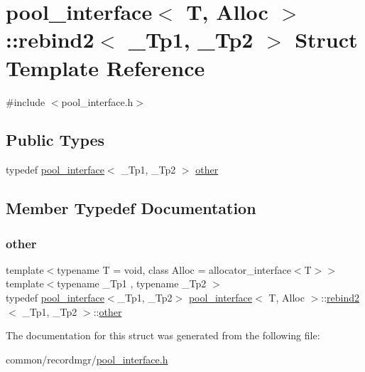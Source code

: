 \hypertarget{structpool__interface_1_1rebind2}{}\section{pool\+\_\+interface$<$ T, Alloc $>$\+:\+:rebind2$<$ \+\_\+\+Tp1, \+\_\+\+Tp2 $>$ Struct Template Reference}
\label{structpool__interface_1_1rebind2}


{\ttfamily \#include $<$pool\+\_\+interface.\+h$>$}

\subsection*{Public Types}
\begin{DoxyCompactItemize}
\item 
typedef \hyperlink{classpool__interface}{pool\+\_\+interface}$<$ \+\_\+\+Tp1, \+\_\+\+Tp2 $>$ \hyperlink{structpool__interface_1_1rebind2_afafbb84e68d8b0cf4c2a0c16ad9c9c87}{other}
\end{DoxyCompactItemize}


\subsection{Member Typedef Documentation}
\mbox{\label{structpool__interface_1_1rebind2_afafbb84e68d8b0cf4c2a0c16ad9c9c87}} 
\subsubsection{\texorpdfstring{other}{other}}
{\footnotesize\ttfamily template$<$typename T  = void, class Alloc  = allocator\+\_\+interface$<$\+T$>$$>$ \\
template$<$typename \+\_\+\+Tp1 , typename \+\_\+\+Tp2 $>$ \\
typedef \hyperlink{classpool__interface}{pool\+\_\+interface}$<$\+\_\+\+Tp1, \+\_\+\+Tp2$>$ \hyperlink{classpool__interface}{pool\+\_\+interface}$<$ T, Alloc $>$\+::\hyperlink{structpool__interface_1_1rebind2}{rebind2}$<$ \+\_\+\+Tp1, \+\_\+\+Tp2 $>$\+::\hyperlink{structpool__interface_1_1rebind2_afafbb84e68d8b0cf4c2a0c16ad9c9c87}{other}}



The documentation for this struct was generated from the following file\+:\begin{DoxyCompactItemize}
\item 
common/recordmgr/\hyperlink{pool__interface_8h}{pool\+\_\+interface.\+h}\end{DoxyCompactItemize}
